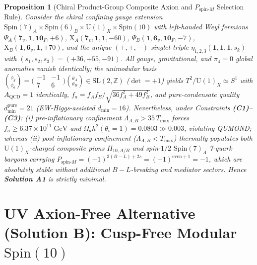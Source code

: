 \documentclass[11pt,a4paper]{article}
\newtheorem{proposition}[theorem]{Proposition}
\begin{document}
\begin{proposition}[Chiral Product-Group Composite Axion and $P_{\mathrm{spin}\text{-}M}$ Selection Rule]
\label{prop:composite}
Consider the chiral confining gauge extension $\mathrm{Spin}(7)_A \times \mathrm{Spin}(6)_B \times \mathrm{U}(1)_X \times \mathrm{Spin}(10)$ \cite{Randall1992,RediSato2016,ContinoPodoRevello2022} with left-handed Weyl fermions $\Psi_A(\mathbf{7}_v,\mathbf{1},\mathbf{10}_F,+6)$, $\mathrm{X}_A(\mathbf{7}_v,\mathbf{1},\mathbf{1},-60)$, $\Psi_B(\mathbf{1},\mathbf{6}_v,\mathbf{10}_F,-7)$, $\mathrm{X}_B(\mathbf{1},\mathbf{6}_v,\mathbf{1},+70)$, and the unique $(+,+,-)$ singlet triple $\eta_{1,2,3}(\mathbf{1},\mathbf{1},\mathbf{1}, s_k)$ with $(s_1,s_2,s_3) = (+36,+55,-91)$. All gauge, gravitational, and $\pi_4 = 0$ global anomalies vanish identically; the unimodular basis $\binom{\phi_g}{\phi_a} = \bigl(\begin{smallmatrix}-1 & -1\\ 7 & 6\end{smallmatrix}\bigr)\binom{\theta_A}{\theta_B} \in \mathrm{SL}(2,\mathbb{Z})$ ($\det = +1$) yields $T^2/\mathrm{U}(1)_X \simeq S^1$ with $A_{\mathrm{QCD}} = 1$ identically, $f_a = f_A f_B/\sqrt{36 f_A^2 + 49 f_B^2}$, and pure-condensate quality $d_{\min}^{\mathrm{pure}} = 21$ (EW-Higgs-assisted $d_{\min} = 16$). Nevertheless, under Constraints \textbf{(C1)}--\textbf{(C3)}: (i) pre-inflationary confinement $\Lambda_{A,B} > 35\,T_{\max}$ forces $f_a \ge 6.37\times 10^{11}\;\mathrm{GeV}$ and $\Omega_a h^2(\theta_i=1) = 0.0803 \gg 0.003$, violating QUMOND; whereas (ii) post-inflationary confinement ($\Lambda_{A,B} < T_{\max}$) thermally populates both $\mathrm{U}(1)_X$-charged composite pions $\Pi_{10,A/B}$ and spin-$1/2$ $\mathrm{Spin}(7)_A$ 7-quark baryons carrying $P_{\mathrm{spin}\text{-}M} = (-1)^{3(B-L)+2s} = (-1)^{\mathrm{even}+1} = -1$, which are absolutely stable without additional $B-L$-breaking and mediator sectors. Hence \textbf{Solution A1} is strictly minimal.
\end{proposition}

\section{UV Axion-Free Alternative (\textbf{Solution B}): Cusp-Free Modular \texorpdfstring{$\mathrm{Spin}(10)$}{Spin(10)}}
\label{sec:modular}
\end{document}
